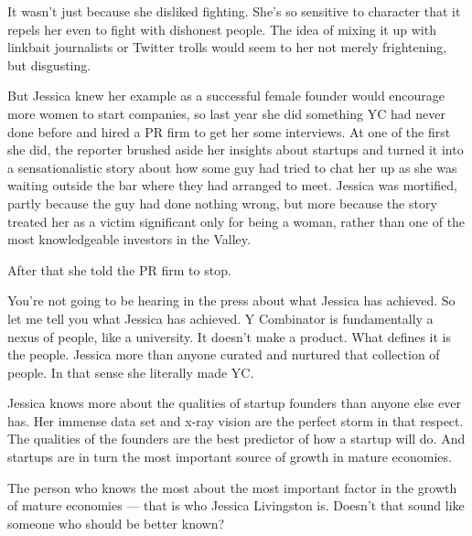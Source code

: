 It wasn't just because she disliked fighting.
                  She's so sensitive to character that it repels her even to
                  fight with dishonest people. The idea of mixing it up with
                  linkbait journalists or Twitter trolls would seem to her not
                  merely frightening, but disgusting.

But Jessica
                  knew her example as a successful female founder would
                  encourage more women to start companies, so last year she did
                  something YC had never done before and hired a PR firm to get
                  her some interviews. At one of the first she did, the reporter
                  brushed aside her insights about startups and turned it into a
                  sensationalistic story about how some guy had tried to chat
                  her up as she was waiting outside the bar where they had
                  arranged to meet. Jessica was mortified, partly because the
                  guy had done nothing wrong, but more because the story treated
                  her as a victim significant only for being a woman, rather
                  than one of the most knowledgeable investors in the Valley.

After
                  that she told the PR firm to stop.

You're not going
                  to be hearing in the press about what Jessica has achieved. So
                  let me tell you what Jessica has achieved.
                  Y Combinator is fundamentally a nexus of people,
                  like a university. It doesn't make a product. What defines it
                  is the people. Jessica more than anyone curated and nurtured
                  that collection of people. In that sense she literally made
                  YC.

Jessica knows more about the qualities of
                  startup founders than anyone else ever has. Her immense data
                  set and x-ray vision are the perfect storm in that respect.
                  The qualities of the founders are the best predictor of how a
                  startup will do. And startups are in turn the most important
                  source of growth in mature economies.

The person
                  who knows the most about the most important factor in the
                  growth of mature economies --- that is who Jessica
                  Livingston is. Doesn't that sound like someone who should be
                  better known?








